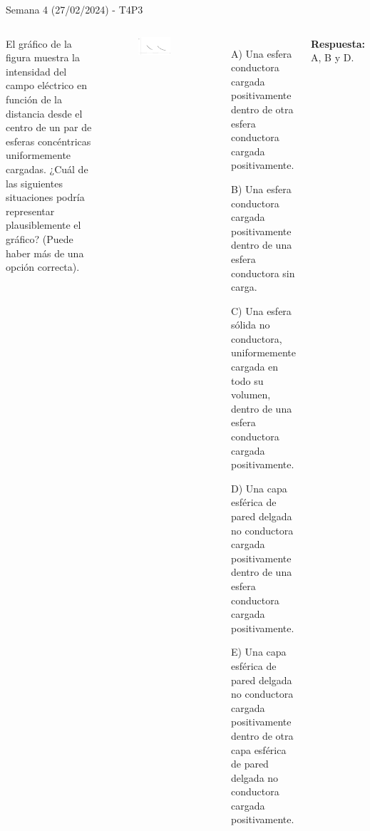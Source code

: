 \begin{frame}{Semana 4 (27/02/2024) - T4P3}
    \begin{columns}
    \footnotesize
    
    El gráfico de la figura muestra la intensidad del campo eléctrico en función de la distancia desde el centro de un par de esferas concéntricas uniformemente cargadas. 
    ¿Cuál de las siguientes situaciones podría representar plausiblemente el gráfico? (Puede haber más de una opción correcta).
    \vspace{-2em}
    \begin{figure}
        \centering
        \includegraphics[scale=0.2]{figures/t4p3.png}
    \end{figure}
    \vspace{-2em}
    \begin{itemize}
        \item[A)] Una esfera conductora cargada positivamente dentro de otra esfera conductora cargada positivamente.
        \item[B)] Una esfera conductora cargada positivamente dentro de una esfera conductora sin carga.
        \item[C)] Una esfera sólida no conductora, uniformemente cargada en todo su volumen, dentro de una esfera conductora cargada positivamente.
        \item[D)] Una capa esférica de pared delgada no conductora cargada positivamente dentro de una esfera conductora cargada positivamente.
        \item[E)] Una capa esférica de pared delgada no conductora cargada positivamente dentro de otra capa esférica de pared delgada no conductora cargada positivamente.
    \end{itemize}
    \pause \centering\textbf{Respuesta:} A, B y D.
    
    \end{columns}

\end{frame}

